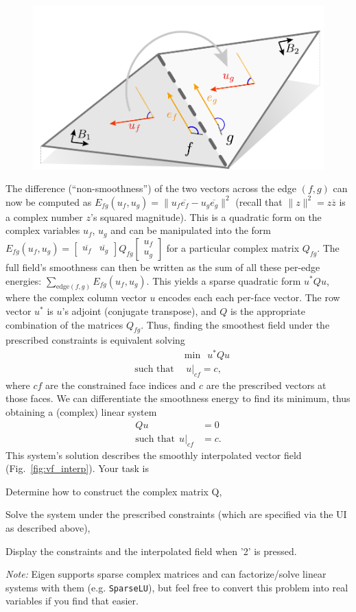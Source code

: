 \documentclass[11pt]{amsart}
\newcommand{\mtrx}[1] {\begin{bmatrix}#1\end{bmatrix}}
\newcommand{\itemz}[1]{{\begin{itemize}{#1}\end{itemize}}}
\begin{document}
\begin{figure}
  \vspace{-20pt}
    \includegraphics[width=.4\columnwidth]{2.pdf}
  \vspace{-20pt}
\end{figure}
The difference (``non-smoothness'') of the two vectors across the edge  $(f,g)$
can now be computed as $E_{fg}(u_f, u_g) = \| u_f \overline{e_f} - u_g \overline{ e_g}\|^2$
(recall that $\|z\|^2 = z \overline{z}$ is a complex number $z$'s squared magnitude).
This is a quadratic form on the complex variables $u_f$, $u_g$ and can be
manipulated into the form $E_{fg}(u_f, u_g) =
\mtrx{\overline{u_f}&\overline{u_g}}  Q_{fg} \mtrx {u_f\\u_g}$ for a particular
complex matrix $Q_{fg}$. The full field's smoothness can then be written as the
sum of all these per-edge energies: $\sum_{\textrm{edge}(f,g) }
E_{fg}(u_f, u_g)$. This yields a sparse quadratic form $u^* Q u$, where the
complex column vector $u$ encodes each each per-face vector. The row
vector $u^*$ is $u$'s adjoint (conjugate transpose), and $Q$ is the
appropriate combination of the matrices $Q_{fg}$. Thus, finding the smoothest
field under the prescribed constraints is equivalent solving
\begin{eqnarray*}
&&\min ~~u^* Q u\\
&\textrm{such that}&~~ u|_{cf} = c,
\end{eqnarray*}
where $cf$ are the constrained face indices and $c$ are the prescribed vectors
at those faces. We can differentiate the smoothness energy to find its minimum,
thus obtaining a (complex) linear system
\begin{align*}
    Q u &= 0 \\
    \textrm{such that}~~ u|_{cf} &= c.
\end{align*}
This system's solution describes the smoothly interpolated vector field
(Fig.~\ref{fig:vf_interp}). Your task is 
\itemz{
\item Determine how to construct the complex matrix Q,
\item Solve the system under the prescribed constraints (which are specified via the UI as described above),
\item Display the constraints and the interpolated field when '2' is pressed.
}
\emph{Note:} Eigen supports sparse complex matrices and can factorize/solve
linear systems with them (e.g. \texttt{SparseLU}), but feel free to convert
this problem into real variables if you find that easier.
\end{document}
